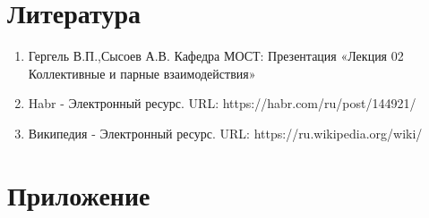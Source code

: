 \documentclass{report}
\begin{document}
\section*{Литература}
\begin{enumerate}
\item Гергель В.П.,Сысоев А.В. Кафедра МОСТ: Презентация «Лекция 02 Коллективные и парные взаимодействия»
\item Habr - Электронный ресурс. URL: https://habr.com/ru/post/144921/
\item Википедия - Электронный ресурс. URL: https://ru.wikipedia.org/wiki/%
\end{enumerate} 
\newpage

\section*{Приложение}
\end{document}
